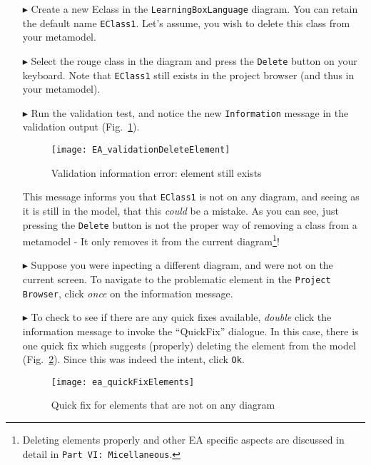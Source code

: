 \begin{enumerate}
\item[$\blacktriangleright$] Create a new Eclass in the \texttt{Learning\-Box\-Language} diagram. You can retain the default name \texttt{EClass1}. Let's
assume, you wish to delete this class from your metamodel.

\item[$\blacktriangleright$] Select the rouge class in the diagram and press the \texttt{Delete} button on your keyboard. Note that \texttt{EClass1} still
exists in the project browser (and thus in your metamodel).

\item[$\blacktriangleright$] Run the validation test, and notice the new \texttt{Information} message in the validation output
(Fig.~\ref{fig:validation_information}).

\begin{figure}[htbp]
	\centering
  \texttt{[image: EA\_validationDeleteElement]}
	\caption{Validation information error: element still exists}
	\label{fig:validation_information}
\end{figure}

This message informs you that \texttt{EClass1} is not on any diagram, and seeing as it is still in the model, that this \emph{could} be a mistake. As you
can see, just pressing the \texttt{Delete} button is not the proper way of removing a class from a metamodel - It only removes it from the current
diagram\footnote{Deleting elements properly and other EA specific aspects are discussed in detail in \texttt{Part VI: Micellaneous}.}!

\item[$\blacktriangleright$] Suppose you were inpecting a different diagram, and were not on the current screen. To navigate to the problematic element in the
\texttt{Project Browser}, click \emph{once} on the information message.

\item[$\blacktriangleright$] To check to see if there are any quick fixes available, \emph{double} click the information message to invoke the ``QuickFix''
dialogue. In this case, there is one quick fix which suggests (properly) deleting the element from the model (Fig.~\ref{fig:quick-fix1}). Since this was indeed
the intent, click \texttt{Ok}.

\begin{figure}[htbp]
	\centering
  \texttt{[image: ea\_quickFixElements]}
	\caption{Quick fix for elements that are not on any diagram}
	\label{fig:quick-fix1}
\end{figure}
\FloatBarrier


\end{enumerate}
